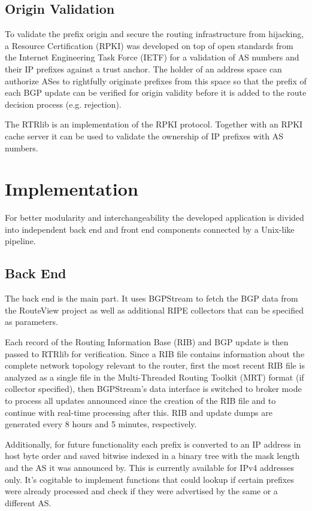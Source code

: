 \subsection{Origin Validation}
To validate the prefix origin and secure the routing infrastructure from
hijacking, a Resource Certification (RPKI) was developed on top of open
standards from the Internet Engineering Task Force (IETF) for a
validation of AS numbers and their IP prefixes against a trust anchor.
The holder of an address space can authorize ASes to rightfully
originate prefixes from this space so that the prefix of each BGP update
can be verified for origin validity before it is added to the route
decision process (e.g. rejection).

The RTRlib is an implementation of the RPKI protocol. Together with an
RPKI cache server it can be used to validate the ownership of IP
prefixes with AS numbers.

\section{Implementation}
For better modularity and interchangeability the developed application
is divided into independent back end and front end components connected
by a Unix-like pipeline.

\subsection{Back End}
The back end is the main part. It uses BGPStream to fetch the BGP data
from the RouteView project as well as additional RIPE collectors that
can be specified as parameters.

Each record of the Routing Information Base (RIB) and BGP update is then
passed to RTRlib for verification. Since a RIB file contains information
about the complete network topology relevant to the router, first the
most recent RIB file is analyzed as a single file in the Multi-Threaded
Routing Toolkit (MRT) format (if collector specified), then BGPStream's
data interface is switched to broker mode to process all updates
announced since the creation of the RIB file and to continue with
real-time processing after this. RIB and update dumps are generated
every 8 hours and 5 minutes, respectively.

Additionally, for future functionality each prefix is converted to an IP
address in host byte order and saved bitwise indexed in a binary tree
with the mask length and the AS it was announced by. This is currently
available for IPv4 addresses only. It's cogitable to implement functions
that could lookup if certain prefixes were already processed and check
if they were advertised by the same or a different AS.

